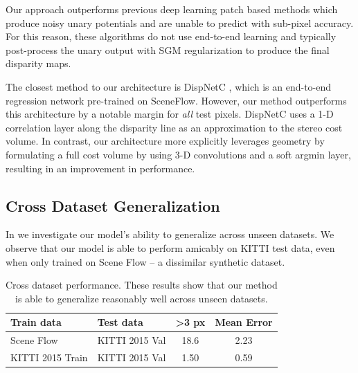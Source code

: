 Our approach outperforms previous deep learning patch based methods \citep{zbontar2015computing,luo2016efficient} which produce noisy unary potentials and are unable to predict with sub-pixel accuracy. For this reason, these algorithms do not use end-to-end learning and typically post-process the unary output with SGM regularization \citep{einecke2015multi} to produce the final disparity maps.

The closest method to our architecture is DispNetC \citep{MIFDB16}, which is an end-to-end regression network pre-trained on SceneFlow. However, our method outperforms this architecture by a notable margin for \textit{all} test pixels. DispNetC uses a 1-D correlation layer along the disparity line as an approximation to the stereo cost volume. In contrast, our architecture more explicitly leverages geometry by formulating a full cost volume by using 3-D convolutions and a soft argmin layer, resulting in an improvement in performance.

\subsection{Cross Dataset Generalization}
\label{sec:generalize}

In  we investigate our model's ability to generalize across unseen datasets. We observe that our model is able to perform amicably on KITTI test data, even when only trained on Scene Flow -- a dissimilar synthetic dataset.

\begin{table}[h]
\centering
\begin{tabular}{l|l|c|c}
Train data & Test data & \textgreater3 px & Mean Error \\ \hline \hline
Scene Flow & KITTI 2015 Val & 18.6 & 2.23 \\
KITTI 2015 Train & KITTI 2015 Val & 1.50 & 0.59 \\
\end{tabular}
	\caption[Cross dataset performance.]{Cross dataset performance. These results show that our method is able to generalize reasonably well across unseen datasets.}
	\label{tbl:generalize}
\end{table}


